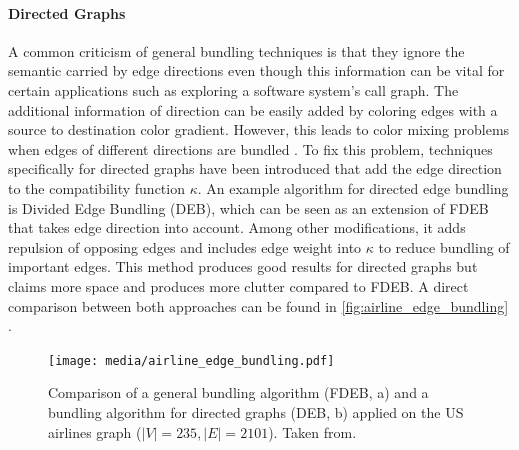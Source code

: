 \paragraph*{Directed Graphs}  A common criticism of general bundling techniques is that they ignore the semantic carried by edge directions even though this information can be vital for certain applications such as exploring a software system's call graph. The additional information of direction can be easily added by coloring edges with a source to destination color gradient. However, this leads to color mixing problems when edges of different directions are bundled \cite{Lhuillier2017}. To fix this problem, techniques specifically for directed graphs have been introduced that add the edge direction to the compatibility function $\kappa$. An example algorithm for directed edge bundling is Divided Edge Bundling (DEB)\cite{Selassie2011}, which can be seen as an extension of FDEB that takes edge direction into account. Among other modifications, it adds repulsion of opposing edges and includes edge weight into $\kappa$ to reduce bundling of important edges. This method produces good results for directed graphs but claims more space and produces more clutter compared to FDEB. A direct comparison between both approaches can be found in \autoref{fig:airline_edge_bundling} \cite{Lhuillier2017}.\\


\begin{figure}
    \centering
    \texttt{[image: media/airline\_edge\_bundling.pdf]}
    \caption{Comparison of a general bundling algorithm (FDEB, a) and a bundling algorithm for directed graphs (DEB, b) applied on the US airlines graph ($|V| = 235, |E| = 2101$). Taken from\cite{Lhuillier2017}.}
    \label{fig:airline_edge_bundling}
\end{figure}


